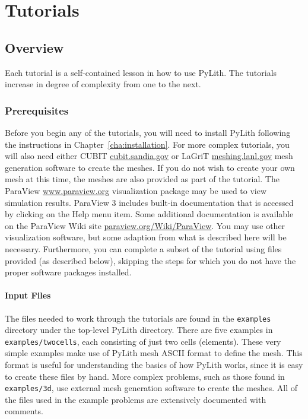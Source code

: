 
\chapter{Tutorials}
\label{cha:examples}

\section{Overview}

Each tutorial is a self-contained lesson in how to use PyLith. The
tutorials increase in degree of complexity from one to the next.


\subsection{Prerequisites}

Before you begin any of the tutorials, you will need to install PyLith
following the instructions in Chapter~\vref{cha:installation}.
For more complex tutorials, you will also need either CUBIT \url{cubit.sandia.gov}
or LaGriT \url{meshing.lanl.gov} mesh generation software to create
the meshes. If you do not wish to create your own mesh at this time,
the meshes are also provided as part of the tutorial. The ParaView
\url{www.paraview.org} visualization package may be used to view
simulation results. ParaView 3 includes built-in documentation that
is accessed by clicking on the Help menu item. Some additional documentation
is available on the ParaView Wiki site \url{paraview.org/Wiki/ParaView}.
You may use other visualization software, but some adaption from what
is described here will be necessary. Furthermore, you can complete
a subset of the tutorial using files provided (as described below),
skipping the steps for which you do not have the proper software packages
installed.


\subsubsection{Input Files}

The files needed to work through the tutorials are found in the \texttt{examples}
directory under the top-level PyLith directory. There are five examples
in \texttt{examples/twocells}, each consisting of just two cells (elements).
These very simple examples make use of PyLith mesh ASCII format to
define the mesh. This format is useful for understanding the basics
of how PyLith works, since it is easy to create these files by hand.
More complex problems, such as those found in \texttt{examples/3d},
use external mesh generation software to create the meshes. All of
the files used in the example problems are extensively documented
with comments.

